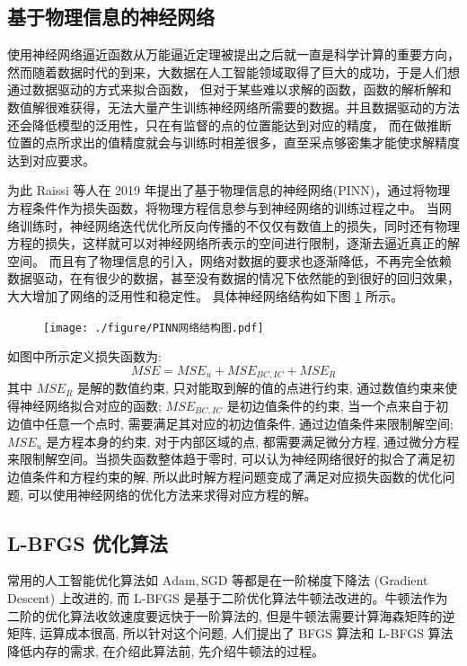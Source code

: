 \documentclass{Sichuan Normal University}
\begin{document}
\subsection{基于物理信息的神经网络}
使用神经网络逼近函数从万能逼近定理被提出之后就一直是科学计算的重要方向，然而随着数据时代的到来，大数据在人工智能领域取得了巨大的成功，于是人们想通过数据驱动的方式来拟合函数，
但对于某些难以求解的函数，函数的解析解和数值解很难获得，无法大量产生训练神经网络所需要的数据。并且数据驱动的方法还会降低模型的泛用性，只在有监督的点的位置能达到对应的精度，
而在做推断位置的点所求出的值精度就会与训练时相差很多，直至采点够密集才能使求解精度达到对应要求。

为此 Raissi 等人在 2019 年提出了基于物理信息的神经网络(PINN)\cite{raissiPhysicsinformedNeuralNetworks2019}，通过将物理方程条件作为损失函数，将物理方程信息参与到神经网络的训练过程之中。
当网络训练时，神经网络迭代优化所反向传播的不仅仅有数值上的损失，同时还有物理方程的损失，这样就可以对神经网络所表示的空间进行限制，逐渐去逼近真正的解空间。
而且有了物理信息的引入，网络对数据的要求也逐渐降低，不再完全依赖数据驱动，在有很少的数据，甚至没有数据的情况下依然能的到很好的回归效果，大大增加了网络的泛用性和稳定性。
具体神经网络结构如下图 \ref{fig:PINN Network Structure} 所示。
\begin{figure}[H]
    \centering
    \texttt{[image: ./figure/PINN网络结构图.pdf]}
    \label{fig:PINN Network Structure}
    \end{figure}
如图中所示定义损失函数为:
\begin{equation}
    M S E=M S E_u+M S E_{B C, I C}+M S E_R
    \label{eq:损失函数}  
\end{equation}其中 $M S E_R$ 是解的数值约束, 只对能取到解的值的点进行约束, 通过数值约束来使得神经网络拟合对应的函数; $M S E_{B C, I C}$ 是初边值条件的约束, 当一个点来自于初边值中任意一个点时, 需要满足其对应的初边值条件, 通过边值条件来限制解空间; 
$M S E_u$ 是方程本身的约束, 对于内部区域的点, 都需要满足微分方程, 通过微分方程来限制解空间。当损失函数整体趋于零时, 可以认为神经网络很好的拟合了满足初边值条件和方程约束的解, 所以此时解方程问题变成了满足对应损失函数的优化问题, 可以使用神经网络的优化方法来求得对应方程的解。

\subsection{L-BFGS 优化算法}
常用的人工智能优化算法如 $\mathrm{Adam}, \mathrm{SGD}$ 等都是在一阶梯度下降法 (Gradient Descent) 上改进的, 而 L-BFGS 是基于二阶优化算法牛顿法改进的。牛顿法作为二阶的优化算法收敛速度要远快于一阶算法的, 
但是牛顿法需要计算海森矩阵的逆矩阵, 运算成本很高, 所以针对这个问题, 人们提出了 BFGS 算法和 L-BFGS 算法降低内存的需求, 在介绍此算法前, 先介绍牛顿法的过程。
\end{document}
